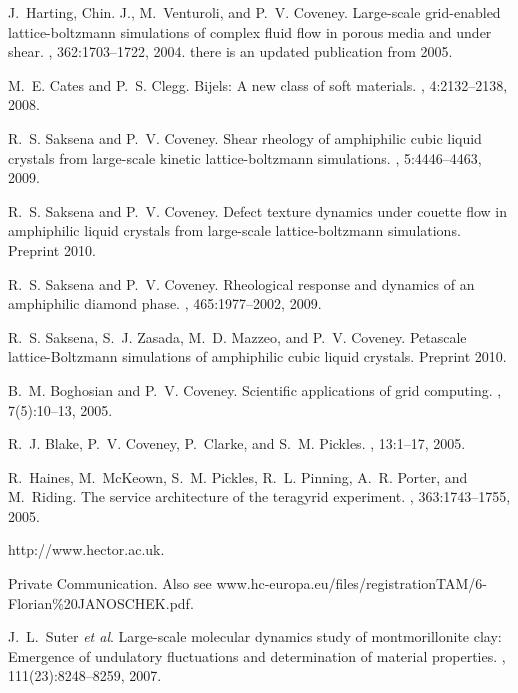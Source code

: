 \begin{thebibliography}{10}
J.~Harting, Chin. J., M.~Venturoli, and P.~V. Coveney.
\newblock Large-scale grid-enabled lattice-boltzmann simulations of complex
  fluid flow in porous media and under shear.
, 362:1703--1722, 2004.
\newblock there is an updated publication from 2005.

M.~E. Cates and P.~S. Clegg.
\newblock Bijels: {A} new class of soft materials.
, 4:2132--2138, 2008.

R.~S. Saksena and P.~V. Coveney.
\newblock Shear rheology of amphiphilic cubic liquid crystals from large-scale
  kinetic lattice-boltzmann simulations.
, 5:4446--4463, 2009.

R.~S. Saksena and P.~V. Coveney.
\newblock Defect texture dynamics under couette flow in amphiphilic liquid
  crystals from large-scale lattice-boltzmann simulations. {Preprint} 2010.

R.~S. Saksena and P.~V. Coveney.
\newblock Rheological response and dynamics of an amphiphilic diamond phase.
, 465:1977--2002, 2009.

R.~S. Saksena, S.~J. Zasada, M.~D. Mazzeo, and P.~V. Coveney.
\newblock Petascale lattice-{B}oltzmann simulations of amphiphilic cubic liquid
  crystals. {Preprint 2010.}

B.~M. Boghosian and P.~V. Coveney.
\newblock Scientific applications of grid computing.
, 7(5):10--13, 2005.

R.~J. Blake, P.~V. Coveney, P.~Clarke, and S.~M. Pickles.
, 13:1--17, 2005.

R.~Haines, M.~McKeown, S.~M. Pickles, R.~L. Pinning, A.~R. Porter, and
  M.~Riding.
\newblock The service architecture of the teragyrid experiment.
, 363:1743--1755, 2005.

{h}ttp://www.hector.ac.uk.

Private Communication. {Also see
  {www.hc-europa.eu/files/registrationTAM/6-Florian\%20JANOSCHEK.pdf}}.

J.~L.~Suter \emph{et al}.
\newblock Large-scale molecular dynamics study of montmorillonite clay:
  Emergence of undulatory fluctuations and determination of material
  properties.
, 111(23):8248--8259, 2007.


\end{thebibliography}
